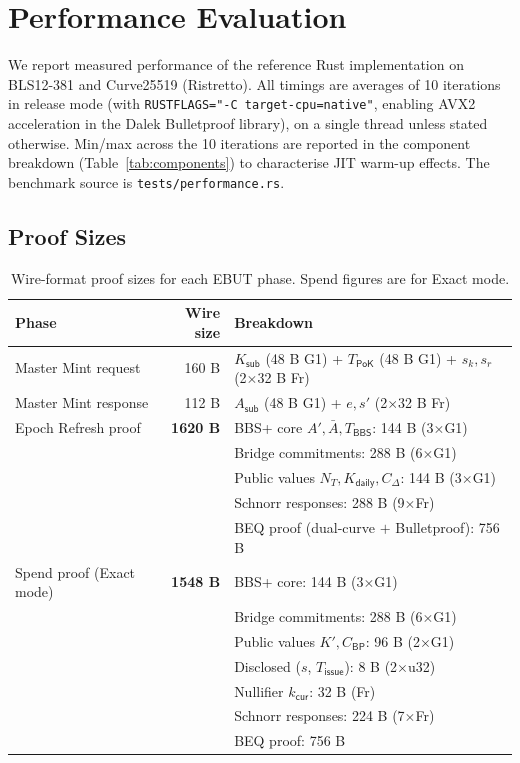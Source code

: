 \documentclass[11pt]{article}
\theoremstyle{definitionstyle}
\theoremstyle{plain}
\begin{document}
\section{Performance Evaluation}
\label{sec:performance}

We report measured performance of the reference Rust implementation on BLS12-381
and Curve25519 (Ristretto).  All timings are averages of 10 iterations in
release mode (with \nolinkurl{RUSTFLAGS="-C target-cpu=native"}, enabling AVX2
acceleration in the Dalek Bulletproof library), on a single thread unless stated
otherwise.  Min/max across the 10 iterations are reported in the component
breakdown (Table~\ref{tab:components}) to characterise JIT warm-up effects.
The benchmark source is \nolinkurl{tests/performance.rs}.

\subsection{Proof Sizes}

\begin{table}[htbp]
\centering
\small
\begin{tabular}{|l|r|l|}
\hline
\textbf{Phase} & \textbf{Wire size} & \textbf{Breakdown} \\
\hline
Master Mint request  & 160 B & $K_{\mathsf{sub}}$ (48 B G1) + $T_{\mathsf{PoK}}$ (48 B G1) + $s_k, s_r$ (2$\times$32 B Fr) \\
Master Mint response & 112 B & $A_{\mathsf{sub}}$ (48 B G1) + $e, s'$ (2$\times$32 B Fr) \\
\hline
Epoch Refresh proof  & \textbf{1620 B} & BBS+ core $A', \bar{A}, T_{\mathsf{BBS}}$: 144 B (3$\times$G1) \\
                     &       & Bridge commitments: 288 B (6$\times$G1) \\
                     &       & Public values $N_T, K_{\mathsf{daily}}, C_\Delta$: 144 B (3$\times$G1) \\
                     &       & Schnorr responses: 288 B (9$\times$Fr) \\
                     &       & BEQ proof (dual-curve $+$ Bulletproof): 756 B \\
\hline
Spend proof (Exact mode) & \textbf{1548 B} & BBS+ core: 144 B (3$\times$G1) \\
                     &       & Bridge commitments: 288 B (6$\times$G1) \\
                     &       & Public values $K', C_{\mathsf{BP}}$: 96 B (2$\times$G1) \\
                     &       & Disclosed ($s$, $T_{\mathsf{issue}}$): 8 B (2$\times$u32) \\
                     &       & Nullifier $k_{\mathsf{cur}}$: 32 B (Fr) \\
                     &       & Schnorr responses: 224 B (7$\times$Fr) \\
                     &       & BEQ proof: 756 B \\
\hline
\end{tabular}
\caption{Wire-format proof sizes for each EBUT phase.  Spend figures are for Exact mode.}
\label{tab:sizes}
\end{table}
\end{document}
